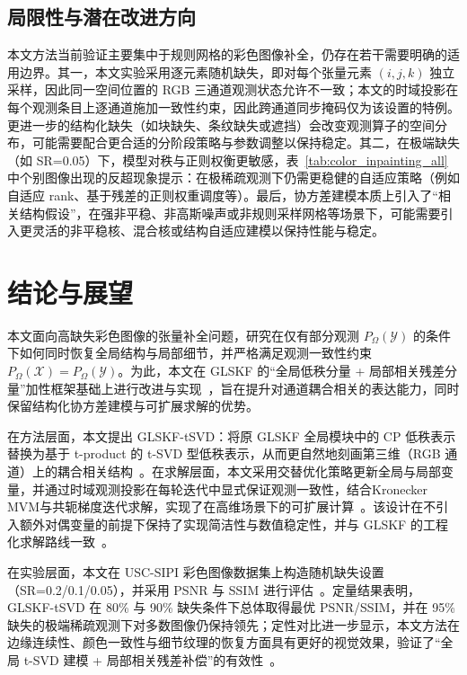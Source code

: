 \documentclass[UTF8]{ctexart}
\begin{document}
\subsection{局限性与潜在改进方向}
本文方法当前验证主要集中于规则网格的彩色图像补全，仍存在若干需要明确的适用边界。其一，本文实验采用逐元素随机缺失，即对每个张量元素 $(i,j,k)$ 独立采样，因此同一空间位置的 RGB 三通道观测状态允许不一致；本文的时域投影在每个观测条目上逐通道施加一致性约束，因此跨通道同步掩码仅为该设置的特例。更进一步的结构化缺失（如块缺失、条纹缺失或遮挡）会改变观测算子的空间分布，可能需要配合更合适的分阶段策略与参数调整以保持稳定。其二，在极端缺失（如 SR=0.05）下，模型对秩与正则权衡更敏感，表~\ref{tab:color_inpainting_all} 中个别图像出现的反超现象提示：在极稀疏观测下仍需更稳健的自适应策略（例如自适应 rank、基于残差的正则权重调度等）。最后，协方差建模本质上引入了“相关结构假设”，在强非平稳、非高斯噪声或非规则采样网格等场景下，可能需要引入更灵活的非平稳核、混合核或结构自适应建模以保持性能与稳定\cite{rasmussen2006gpml}。

\section{结论与展望}

本文面向高缺失彩色图像的张量补全问题，研究在仅有部分观测 $P_{\Omega}(\mathcal{Y})$ 的条件下如何同时恢复全局结构与局部细节，并严格满足观测一致性约束 $P_{\Omega}(\mathcal{X})=P_{\Omega}(\mathcal{Y})$。为此，本文在 GLSKF 的“全局低秩分量 + 局部相关残差分量”加性框架基础上进行改进与实现~\cite{lei2024glskf}，旨在提升对通道耦合相关的表达能力，同时保留结构化协方差建模与可扩展求解的优势。

在方法层面，本文提出 GLSKF-tSVD：将原 GLSKF 全局模块中的 CP 低秩表示替换为基于 t-product 的 t-SVD 型低秩表示，从而更自然地刻画第三维（RGB 通道）上的耦合相关结构~\cite{zhang2017tsvd}。在求解层面，本文采用交替优化策略更新全局与局部变量，并通过时域观测投影在每轮迭代中显式保证观测一致性，结合Kronecker MVM与共轭梯度迭代求解，实现了在高维场景下的可扩展计算~\cite{hestenes1952cg}。该设计在不引入额外对偶变量的前提下保持了实现简洁性与数值稳定性，并与 GLSKF 的工程化求解路线一致~\cite{lei2024glskf}。

在实验层面，本文在 USC-SIPI 彩色图像数据集上构造随机缺失设置（SR=0.2/0.1/0.05），并采用 PSNR 与 SSIM 进行评估~\cite{wang2004ssim}。定量结果表明，GLSKF-tSVD 在 80\% 与 90\% 缺失条件下总体取得最优 PSNR/SSIM，并在 95\% 缺失的极端稀疏观测下对多数图像仍保持领先；定性对比进一步显示，本文方法在边缘连续性、颜色一致性与细节纹理的恢复方面具有更好的视觉效果，验证了“全局 t-SVD 建模 + 局部相关残差补偿”的有效性~\cite{lei2024glskf}。
\end{document}

